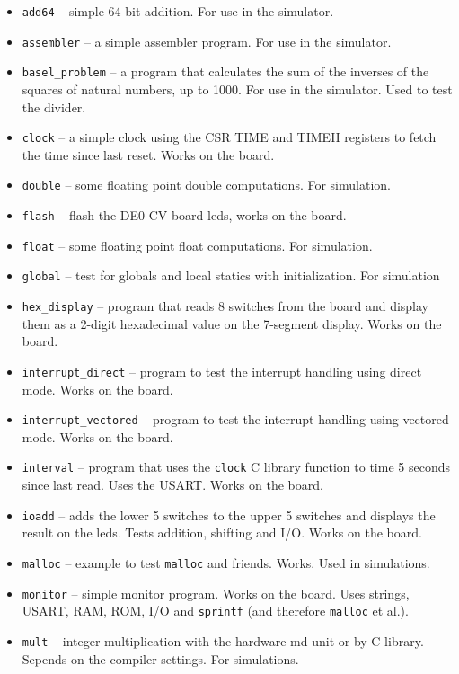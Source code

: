 \documentclass[12pt]{article}
\begin{document}
\begin{itemize}
\item \texttt{add64} -- simple 64-bit addition. For use in the simulator.
\item \texttt{assembler} -- a simple assembler program. For use in the simulator.
\item \texttt{basel\_problem} -- a program that calculates the sum of the inverses of the squares of natural numbers, up to 1000. For use in the simulator. Used to test the divider.
\item \texttt{clock} -- a simple clock using the CSR TIME and TIMEH registers to fetch the time since last reset. Works on the board.
\item \texttt{double} -- some floating point double computations. For simulation.
\item \texttt{flash} -- flash the DE0-CV board leds, works on the board.
\item \texttt{float} -- some floating point float computations. For simulation.
\item \texttt{global} -- test for globals and local statics with initialization. For simulation
\item \texttt{hex\_display} -- program that reads 8 switches from the board and display them as a 2-digit hexadecimal value on the 7-segment display. Works on the board.
\item \texttt{interrupt\_direct} -- program to test the interrupt handling using direct mode. Works on the board.
\item \texttt{interrupt\_vectored} -- program to test the interrupt handling using vectored mode. Works on the board.
\item \texttt{interval} -- program that uses the \texttt{clock} C library function to time 5 seconds since last read. Uses the USART. Works on the board.
\item \texttt{ioadd} -- adds the lower 5 switches to the upper 5 switches and displays the result on the leds. Tests addition, shifting and I/O. Works on the board.
\item \texttt{malloc} -- example to test \texttt{malloc} and friends. Works. Used in simulations.
\item \texttt{monitor} -- simple monitor program. Works on the board. Uses strings, USART, RAM, ROM, I/O and \texttt{sprintf} (and therefore \texttt{malloc} et al.).
\item \texttt{mult} -- integer multiplication with the hardware md unit or by C library. Sepends on the compiler settings. For simulations.

\end{itemize}
\end{document}
